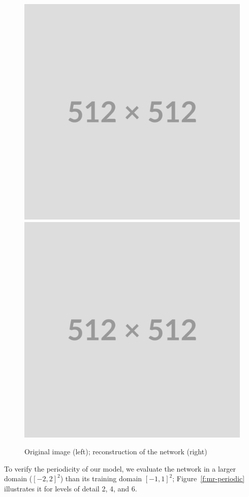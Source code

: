 
\begin{figure}[h]
\centering
\includegraphics[width=0.42\linewidth]{img/placeholder512.png}
\includegraphics[width=0.42\linewidth]{img/placeholder512.png}
\caption{Original image (left); reconstruction of the network (right) 
}
\label{f:rec_gt}
\end{figure}

To verify the periodicity of our model, we evaluate the network in a larger domain ($[-2, 2]^2$) than its training domain $[-1, 1]^2$; Figure~\ref{f:mr-periodic} illustrates it for levels of detail 2, 4, and 6.

